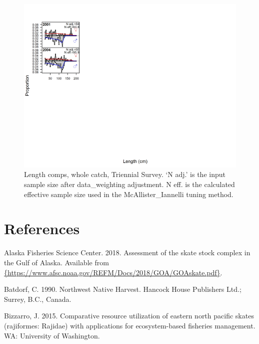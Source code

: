 \documentclass[12pt,]{article}
\begin{document}
\begin{figure}
\centering
\includegraphics{./r4ss/plots_mod1/comp_lenfit_flt6mkt0.png}
\caption{Length comps, whole catch, Triennial Survey. `N adj.' is the
input sample size after data\_weighting adjustment. N eff. is the
calculated effective sample size used in the McAllister\_Iannelli tuning
method. \label{fig:mod1_4_comp_lenfit_flt6mkt0}}
\end{figure}

\newpage

\color{black}

\hypertarget{references}{%
\section*{References}\label{references}}

\renewcommand{\thepage}{}

\hypertarget{refs}{}
\leavevmode\hypertarget{ref-AFSC2018}{}%
Alaska Fisheries Science Center. 2018. Assessment of the skate stock
complex in the Gulf of Alaska. Available from
\href{\%7Bhttps://www.afsc.noaa.gov/REFM/Docs/2018/GOA/GOAskate.pdf\%7D}{\{https://www.afsc.noaa.gov/REFM/Docs/2018/GOA/GOAskate.pdf\}}.

\leavevmode\hypertarget{ref-Batdorf1990}{}%
Batdorf, C. 1990. Northwest Native Harvest. Hancock House Publishers
Ltd.; Surrey, B.C., Canada.

\leavevmode\hypertarget{ref-Bizzarro2015}{}%
Bizzarro, J. 2015. Comparative resource utilization of eastern north
pacific skates (rajiformes: Rajidae) with applications for
ecosystem-based fisheries management. WA: University of Washington.
\end{document}
